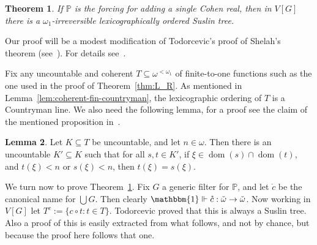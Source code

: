 \documentclass[10pt]{amsart}
\newtheorem{theorem}{Theorem}[section]
\theoremstyle{definition}
\newtheorem{lemma}[theorem]{Lemma}
\theoremstyle{remark}
\newcommand{\seb}{\subseteq}
\renewcommand{\P}{\mathbb{P}}
\newcommand{\1}{\mathbbm{1}}
\newcommand{\ck}[1]{\check{#1}}
\newcommand{\dt}[1]{\mathring{#1}}
\DeclareMathOperator{\dom}{dom}
\begin{document}
\begin{theorem}\label{thm:sro_cohen_real}
  If $\mathbb{P}$ is the forcing for adding a single Cohen real, then in
  $V[G]$ there is a $\omega_{1}$-irreversible lexicographically ordered Suslin
  tree.
\end{theorem}

Our proof will be a modest modification of Todorcevic's proof of Shelah's theorem
(see~\cite{Todorcevic1987}). For details
see~\cite[Proposition~20.7]{Halbeisen2017}.


Fix any uncountable and coherent $T \seb \omega^{<\omega_{1}}$ of finite-to-one
functions such as the one used in the proof of Theorem~\ref{thm:L_R}. As
mentioned in Lemma~\ref{lem:coherent-fin-countryman}, the lexicographic ordering
of $T$ is a Countryman line.
We also need the following lemma, for a proof see the claim
of the mentioned proposition in~\cite{Halbeisen2017}.

\begin{lemma}\label{lem:halbeisen}
  Let $K \seb T$ be uncountable, and let $n \in \omega$. Then
  there is an uncountable $K' \seb K$ such that
  for all $s,t \in K'$, if $\xi \in \dom(s) \cap \dom(t)$,
  and $t(\xi) < n$ or $s(\xi) <n$, then $t(\xi) = s(\xi)$.
\end{lemma}

We turn now to prove Theorem~\ref{thm:sro_cohen_real}.
Fix $G$ a generic filter for $\P$, and let $\dt{c}$ be the canonical
name for $\bigcup G$. Then clearly $\1 \Vdash \dt{c} : \ck{\omega} \to \ck{\omega}$.
Now working in $V[G]$ let $T^{c} := \{c \circ t : t \in T\}$. Todorcevic
proved that this is always a Suslin tree. Also a proof of this
is easily extracted from what follows, and not by chance, but because
the proof here follows that one.
\end{document}
